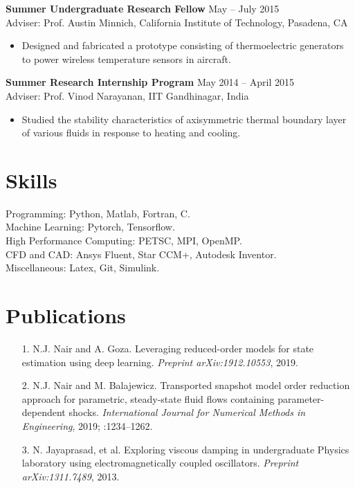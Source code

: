 \documentclass[margin]{res}
\begin{document}
\begin{resume}
{\bf Summer Undergraduate Research Fellow} \hfill May -- July 2015\\
Adviser: Prof. Austin Minnich, California Institute of Technology, Pasadena, CA
\begin{itemize}
\item Designed and fabricated a prototype consisting of thermoelectric generators to
power wireless temperature sensors in aircraft.
\end{itemize}

{\bf Summer Research Internship Program} \hfill   May 2014 -- April 2015\\
Adviser: Prof. Vinod Narayanan, IIT Gandhinagar, India
\begin{itemize}
\item Studied the stability characteristics of axisymmetric thermal boundary layer of various fluids in response to heating and cooling.
\end{itemize}


\section{\large Skills}		 
Programming: Python, Matlab, Fortran, C.\\
Machine Learning: Pytorch, Tensorflow.\\
High Performance Computing: PETSC, MPI, OpenMP.\\
CFD and CAD: Ansys Fluent, Star CCM+, Autodesk Inventor.\\ 
Miscellaneous: Latex, Git, Simulink.

\section{\large Publications}
 \begin{itemize}
 \item[1.] N.J. Nair and A. Goza. Leveraging reduced-order models for state estimation using deep learning. \textit{Preprint arXiv:1912.10553}, 2019.
 
 \item[2.] N.J. Nair and M. Balajewicz. Transported snapshot model order reduction approach for parametric, steady-state fluid flows containing parameter-dependent shocks. \textit{International Journal for Numerical Methods in Engineering}, 2019; :1234–1262.
 
  \item[3.] N. Jayaprasad, et al. Exploring viscous damping in undergraduate Physics laboratory using electromagnetically coupled oscillators. \textit{Preprint arXiv:1311.7489}, 2013.
 \end{itemize}
 

\end{resume}
\end{document}
